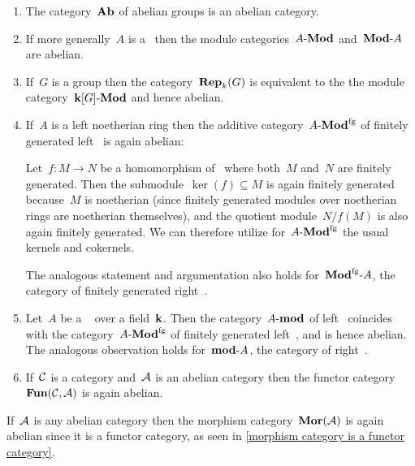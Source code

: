 \begin{example}
  \leavevmode
  \begin{enumerate}
    \item
      The category~$\mathbf{Ab}$ of abelian groups is an abelian category.
    \item
      If more generally~$A$ is a~{\kalg} then the module categories~$\text{$A$-$\mathbf{Mod}$}$ and~$\text{$\mathbf{Mod}$-$A$}$ are abelian.
    \item
      If~$G$ is a group then the category~$\mathbf{Rep}_{k}(G)$ is equivalent to the the module category~$\text{$\mathbf{k}[G]$-$\mathbf{Mod}$}$ and hence abelian.
    \item
      If~$A$ is a left noetherian ring then the additive category~$\text{$A$-$\mathbf{Mod}^{\mathrm{fg}}$}$ of finitely generated left~{} is again abelian:
      
      Let~$f \colon M \to N$ be a homomorphism of~{} where both~$M$ and~$N$ are finitely generated.
      Then the submodule~$\ker(f) \subseteq M$ is again finitely generated because~$M$ is noetherian (since finitely generated modules over noetherian rings are noetherian themselves), and the quotient module~$N/f(M)$ is also again finitely generated.
      We can therefore utilize for~$\text{$A$-$\mathbf{Mod}^{\mathrm{fg}}$}$ the usual kernels and cokernels.
      
      The analogous statement and argumentation also holds for~$\text{$\mathbf{Mod}^{\mathrm{fg}}$-$A$}$, the category of finitely generated right~{}.
    \item
      Let~$A$ be a {\fd}~{\kalg} over a field~$\mathbf{k}$.
      Then the category~$\text{$A$-$\mathbf{mod}$}$ of {\fd} left~{} coincides with the category~$\text{$A$-$\mathbf{Mod}^{\mathrm{fg}}$}$ of finitely generated left~{}, and is hence abelian.
      The analogous observation holds for~$\text{$\mathbf{mod}$-$A$}$, the category of {\fd} right~{}.
    \item
      If~$\mathcal{C}$ is a category and~$\mathcal{A}$ is an abelian category then the functor category~$\mathbf{Fun}(\mathcal{C}, \mathcal{A})$ is again abelian.
  \end{enumerate}
\end{example}


\begin{example*}
  If~$\mathcal{A}$ is any abelian category then the morphism category~$\mathbf{Mor}(\mathcal{A})$ is again abelian since it is a functor category, as seen in \cref{morphism category is a functor category}.
\end{example*}


